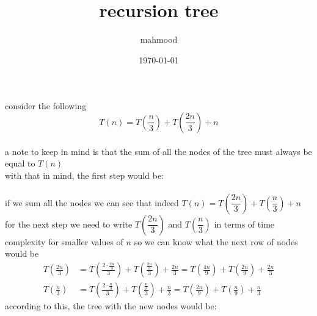 \documentclass[a4paper,12pt]{article}
\author{mahmood}
\date{\today}
\title{recursion tree}
\begin{document}
\maketitle
\begin{my_example}
consider the following \\[0pt]
\[ T(n) = T\left(\frac{n}{3}\right) + T\left(\frac{2n}{3}\right) + n \]\\[0pt]
a note to keep in mind is that the sum of all the nodes of the tree must always be equal to \(T(n)\)\\[0pt]
with that in mind, the first step would be:\\[0pt]
\\[0pt]

if we sum all the nodes we can see that indeed \(T(n) = T\left(\dfrac{2n}{3}\right) + T\left(\dfrac{n}{3}\right) + n\)\\[0pt]
for the next step we need to write \(T\left(\dfrac{2n}{3}\right)\) and \(T\left(\dfrac{n}{3}\right)\) in terms of time complexity for smaller values of \(n\) so we can know what the next row of nodes would be\\[0pt]
\begin{align*}
  T\left(\frac{2n}{3}\right) &= T\left(\frac{2 \cdot \frac{2n}{3}}{3}\right) + T\left(\frac{\frac{2n}{3}}{3}\right) + \frac{2n}{3} = T\left(\frac{4n}{9}\right) + T\left(\frac{2n}{9}\right) + \frac{2n}{3}\\
  T\left(\frac{n}{3}\right) &= T\left(\frac{2 \cdot \frac{n}{3}}{3}\right) + T\left(\frac{\frac{n}{3}}{3}\right) + \frac{n}{3} = T\left(\frac{2n}{9}\right) + T\left(\frac{n}{9}\right) + \frac{n}{3}
\end{align*}
according to this, the tree with the new nodes would be:\\[0pt]
\\[0pt]


\end{my_example}
\end{document}
